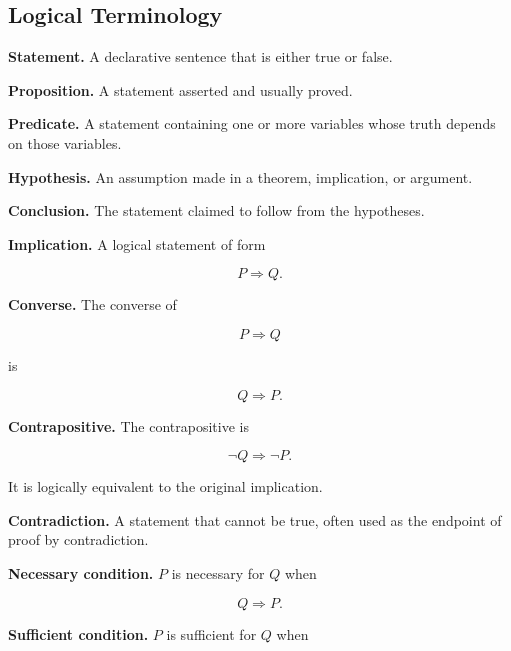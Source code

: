 \subsection{Logical Terminology}
\label{subsec:logical-terminology-reference}

\textbf{Statement.}
A declarative sentence that is either true or false.

\medskip

\textbf{Proposition.}
A statement asserted and usually proved.

\medskip

\textbf{Predicate.}
A statement containing one or more variables whose truth depends on those
variables.

\medskip

\textbf{Hypothesis.}
An assumption made in a theorem, implication, or argument.

\medskip

\textbf{Conclusion.}
The statement claimed to follow from the hypotheses.

\medskip

\textbf{Implication.}
A logical statement of form

\[
\boxed{
P\Rightarrow Q.
}
\]

\medskip

\textbf{Converse.}
The converse of

\[
P\Rightarrow Q
\]

is

\[
\boxed{
Q\Rightarrow P.
}
\]

\medskip

\textbf{Contrapositive.}
The contrapositive is

\[
\boxed{
\neg Q\Rightarrow\neg P.
}
\]

It is logically equivalent to the original implication.

\medskip

\textbf{Contradiction.}
A statement that cannot be true, often used as the endpoint of proof by
contradiction.

\medskip

\textbf{Necessary condition.}
\(P\) is necessary for \(Q\) when

\[
\boxed{
Q\Rightarrow P.
}
\]

\medskip

\textbf{Sufficient condition.}
\(P\) is sufficient for \(Q\) when

